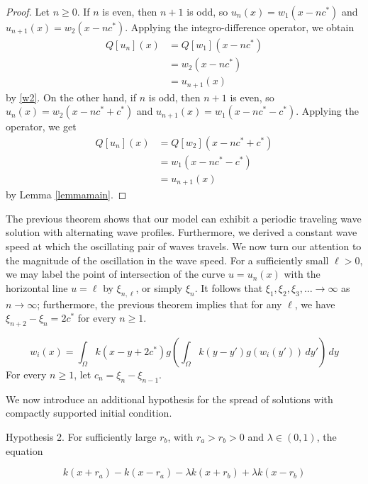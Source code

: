 \documentclass[11pt]{article}
\theoremstyle{definition}
\numberwithin{equation}{section}
\numberwithin{thm}{section}
\begin{document}
\begin{proof}
Let $n \geq 0$. If $n$ is even, then $n+1$ is odd, so $u_n(x)=w_1(x-nc^*)$ and $u_{n+1}(x)=w_2(x-nc^*)$. Applying the integro-difference operator, we obtain
\begin{equation} \begin{aligned}
Q[u_n](x) &= Q[w_1](x-nc^*) \\
&= w_2(x-nc^*) \\
&= u_{n+1}(x)
\end{aligned} \end{equation}
by \eqref{w2}. On the other hand, if $n$ is odd, then $n+1$ is even, so $u_n(x)=w_2(x-nc^*+c^*)$ and $u_{n+1}(x)=w_1(x-nc^*-c^*)$. Applying the operator, we get
\begin{equation} \begin{aligned}
Q[u_n](x) &= Q[w_2](x-nc^*+c^*) \\
&= w_1(x-nc^*-c^*) \\
&= u_{n+1}(x)
\end{aligned} \end{equation}
by Lemma \ref{lemmamain}.
\end{proof}





The previous theorem shows that our model can exhibit a periodic traveling wave solution with alternating wave profiles. Furthermore, we derived a constant wave speed at which the oscillating pair of waves travels. We now turn our attention to the magnitude of the oscillation in the wave speed. For a sufficiently small $\ell > 0$, we may label the point of intersection of the curve $u=u_n(x)$ with the horizontal line $u=\ell$ by $\xi_{n,\ell}$, or simply $\xi_n$. It follows that $\xi_1,\xi_2,\xi_3,\dots\to\infty$ as $n\to\infty$; furthermore, the previous theorem implies that for any $\ell$, we have $\xi_{n+2}-\xi_n=2c^*$ for every $n\geq 1$.

$$
w_i(x) = \int_\Omega k(x-y+2c^*) g\left( \int_\Omega k(y-y') g(w_i(y')) \, dy' \right) \, dy
$$
For every $n\geq 1$, let $c_n = \xi_n - \xi_{n-1}$.

We now introduce an additional hypothesis for the spread of solutions with compactly supported initial condition.

Hypothesis 2. For sufficiently large $r_b$, with $r_a > r_b > 0$ and $\lambda \in (0,1)$, the equation

$$ k(x+r_a) - k(x-r_a) - \lambda k(x+r_b) + \lambda k(x-r_b) $$
\end{document}
